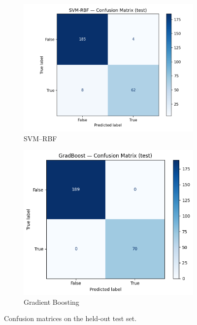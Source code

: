 \documentclass[journal]{IEEEtran}
\begin{document}
\begin{figure}[H]
	\centering
	\begin{subfigure}{.48\linewidth}
		\centering
		\includegraphics[width=\linewidth]{assets/cm_svmrbf_test.png}%
		\caption{SVM--RBF}
	\end{subfigure}\hfill
	\begin{subfigure}{.48\linewidth}
		\centering
		\includegraphics[width=\linewidth]{assets/gb_cm.png}%
		\caption{Gradient Boosting}
	\end{subfigure}
	\caption{Confusion matrices on the held-out test set.}
	\label{fig:cm-nonlinear}
\end{figure}
\end{document}
